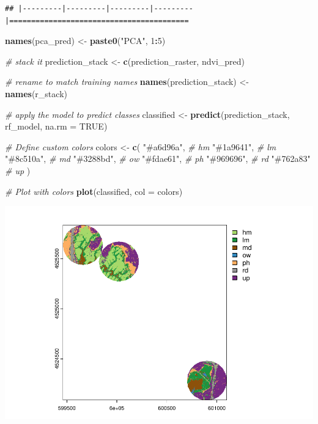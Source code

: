 \documentclass[
]{article}
\newenvironment{Shaded}{\begin{snugshade}}{\end{snugshade}}
\newcommand{\AttributeTok}[1]{\textcolor[rgb]{0.13,0.29,0.53}{#1}}
\newcommand{\CommentTok}[1]{\textcolor[rgb]{0.56,0.35,0.01}{\textit{#1}}}
\newcommand{\ConstantTok}[1]{\textcolor[rgb]{0.56,0.35,0.01}{#1}}
\newcommand{\DecValTok}[1]{\textcolor[rgb]{0.00,0.00,0.81}{#1}}
\newcommand{\FunctionTok}[1]{\textcolor[rgb]{0.13,0.29,0.53}{\textbf{#1}}}
\newcommand{\NormalTok}[1]{#1}
\newcommand{\OtherTok}[1]{\textcolor[rgb]{0.56,0.35,0.01}{#1}}
\newcommand{\SpecialCharTok}[1]{\textcolor[rgb]{0.81,0.36,0.00}{\textbf{#1}}}
\newcommand{\StringTok}[1]{\textcolor[rgb]{0.31,0.60,0.02}{#1}}
\begin{document}
\begin{verbatim}
## |---------|---------|---------|---------|=========================================                                          
\end{verbatim}

\begin{Shaded}
\begin{Highlighting}[]
\FunctionTok{names}\NormalTok{(pca\_pred) }\OtherTok{\textless{}{-}} \FunctionTok{paste0}\NormalTok{(}\StringTok{"PCA"}\NormalTok{, }\DecValTok{1}\SpecialCharTok{:}\DecValTok{5}\NormalTok{)}

\CommentTok{\# stack it}
\NormalTok{prediction\_stack }\OtherTok{\textless{}{-}} \FunctionTok{c}\NormalTok{(prediction\_raster, ndvi\_pred)}

\CommentTok{\# rename to match training names}
\FunctionTok{names}\NormalTok{(prediction\_stack) }\OtherTok{\textless{}{-}} \FunctionTok{names}\NormalTok{(r\_stack)}

\CommentTok{\# apply the model to predict classes}
\NormalTok{classified }\OtherTok{\textless{}{-}} \FunctionTok{predict}\NormalTok{(prediction\_stack, rf\_model, }\AttributeTok{na.rm =} \ConstantTok{TRUE}\NormalTok{)}

\CommentTok{\# Define custom colors}
\NormalTok{colors }\OtherTok{\textless{}{-}} \FunctionTok{c}\NormalTok{(}
  \StringTok{"\#a6d96a"}\NormalTok{,  }\CommentTok{\# hm  }
  \StringTok{"\#1a9641"}\NormalTok{,  }\CommentTok{\# lm  }
  \StringTok{"\#8c510a"}\NormalTok{,  }\CommentTok{\# md  }
  \StringTok{"\#3288bd"}\NormalTok{,  }\CommentTok{\# ow  }
  \StringTok{"\#fdae61"}\NormalTok{,  }\CommentTok{\# ph  }
  \StringTok{"\#969696"}\NormalTok{,  }\CommentTok{\# rd  }
  \StringTok{"\#762a83"}   \CommentTok{\# up  }
\NormalTok{)}



\CommentTok{\# Plot with colors}
\FunctionTok{plot}\NormalTok{(classified, }\AttributeTok{col =}\NormalTok{ colors)}
\end{Highlighting}
\end{Shaded}

\includegraphics{veg_model_new_class_files/figure-latex/unnamed-chunk-12-1.pdf}
\end{document}
